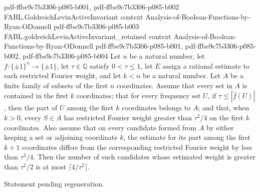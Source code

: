 \begin{theorem}
  {pdf-ffbe9c7b3306-p085-b001,
    pdf-ffbe9c7b3306-p085-b002}
\proofstep
  {FABL.GoldreichLevinActiveInvariant}
  {context}
  {Analysis-of-Boolean-Functions-by-Ryan-ODonnell}
  {pdf-ffbe9c7b3306-p085-b003}
\proofstep
  {FABL.goldreichLevinActiveInvariant_retained}
  {context}
  {Analysis-of-Boolean-Functions-by-Ryan-ODonnell}
  {pdf-ffbe9c7b3306-p085-b001,
    pdf-ffbe9c7b3306-p085-b002,
    pdf-ffbe9c7b3306-p085-b004}
Let $n$ be a natural number, let $f:\{\pm1\}^n\to\{\pm1\}$, let $\tau\in\mathbb{Q}$
satisfy $0<\tau\le1$, let $E$ assign a rational estimate to each restricted Fourier
weight, and let $k<n$ be a natural number. Let $A$ be a finite family of subsets of the
first $n$ coordinates. Assume that every set in $A$ is contained in the first $k$
coordinates; that for every frequency set $U$, if $\tau\le|\widehat f(U)|$, then the
part of $U$ among the first $k$ coordinates belongs to $A$; and that, when $k>0$, every
$S\in A$ has restricted Fourier weight greater than $\tau^2/4$ on the first $k$
coordinates. Also assume that on every candidate formed from $A$ by either keeping a set
or adjoining coordinate $k$, the estimate for its part among the first $k+1$ coordinates
differs from the corresponding restricted Fourier weight by less than $\tau^2/4$. Then
the number of such candidates whose estimated weight is greater than $\tau^2/2$ is at
most $\lceil4/\tau^2\rceil$.
\end{theorem}

\begin{theorem}
\label{FABL.goldreichLevinRefine_eq_some_retained_of_stageAccurate}
\leanok
{}
Statement pending regeneration.
\end{theorem}
